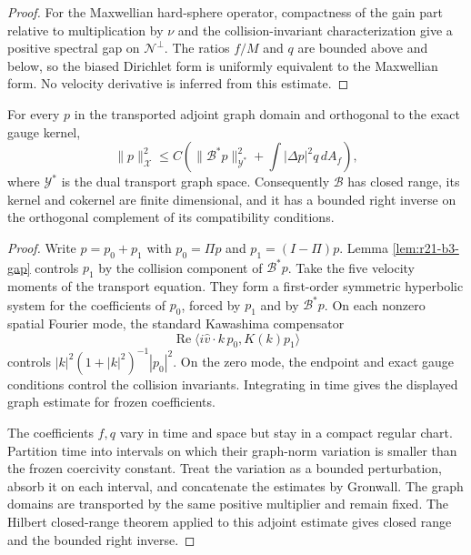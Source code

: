 \begin{proof}
For the Maxwellian hard-sphere operator, compactness of the gain part relative
to multiplication by $\nu$ and the collision-invariant characterization give
a positive spectral gap on $\mathcal N^\perp$.  The ratios $f/M$ and $q$ are
bounded above and below, so the biased Dirichlet form is uniformly equivalent
to the Maxwellian form.  No velocity derivative is inferred from this
estimate.
\end{proof}

\begin{theorem}
\label{thm:r21-b3-observability}
For every $p$ in the transported adjoint graph domain and orthogonal to the
exact gauge kernel,
\[
 \|p\|_{\mathcal X}^2
 \le C\left(
 \|\mathcal B^*p\|_{\mathcal Y^*}^2
 +\int|\Delta p|^2q\,dA_f\right),
\]
where $\mathcal Y^*$ is the dual transport graph space.  Consequently
$\mathcal B$ has closed range, its kernel and cokernel are finite dimensional,
and it has a bounded right inverse on the orthogonal complement of its
compatibility conditions.
\end{theorem}

\begin{proof}
Write $p=p_0+p_1$ with $p_0=\Pi p$ and $p_1=(I-\Pi)p$.  Lemma
\ref{lem:r21-b3-gap} controls $p_1$ by the collision component of
$\mathcal B^*p$.  Take the five velocity moments of the transport equation.
They form a first-order symmetric hyperbolic system for the coefficients of
$p_0$, forced by $p_1$ and by $\mathcal B^*p$.  On each nonzero spatial Fourier
mode, the standard Kawashima compensator
\[
 \operatorname{Re}\langle i\widehat v\cdot k\,p_0,
                         K(k)p_1\rangle
\]
controls $|k|^2(1+|k|^2)^{-1}|p_0|^2$.  On the zero mode, the endpoint and
exact gauge conditions control the collision invariants.  Integrating in time
gives the displayed graph estimate for frozen coefficients.

The coefficients $f,q$ vary in time and space but stay in a compact regular
chart.  Partition time into intervals on which their graph-norm variation is
smaller than the frozen coercivity constant.  Treat the variation as a bounded
perturbation, absorb it on each interval, and concatenate the estimates by
Gronwall.  The graph domains are transported by the same positive multiplier
and remain fixed.  The Hilbert closed-range theorem applied to this adjoint
estimate gives closed range and the bounded right inverse.
\end{proof}

